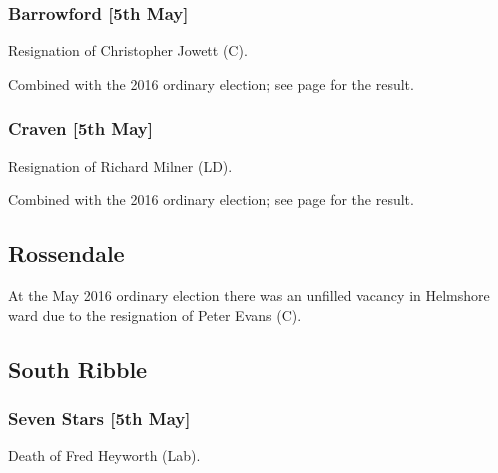 \documentclass[a4paper,openany]{book}
\begin{document}
\begin{resultsiii}
\subsubsection*{Barrowford \hspace*{\fill}\nolinebreak[1]%
\enspace\hspace*{\fill}
[5th May]}


Resignation of Christopher Jowett (C).

Combined with the 2016 ordinary election; see page \pageref{BarrowfordPendle} for the result.

\subsubsection*{Craven \hspace*{\fill}\nolinebreak[1]%
\enspace\hspace*{\fill}
[5th May]}


Resignation of Richard Milner (LD).

Combined with the 2016 ordinary election; see page \pageref{CravenPendle} for the result.

\subsection*{Rossendale}

At the May 2016 ordinary election there was an unfilled vacancy in Helmshore ward due to the resignation of Peter Evans (C).

\subsection*{South Ribble}

\subsubsection*{Seven Stars \hspace*{\fill}\nolinebreak[1]%
\enspace\hspace*{\fill}
[5th May]}


Death of Fred Heyworth (Lab).


\end{resultsiii}
\end{document}

